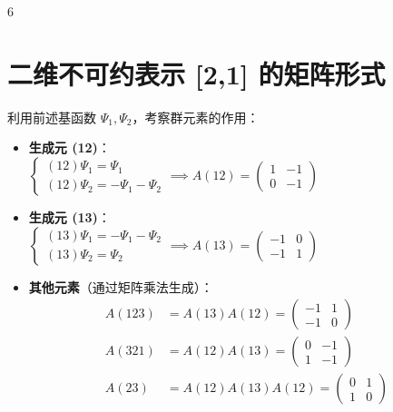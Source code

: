 \documentclass[landscape]{article}
\begin{document}
\begin{multicols*}{6}
\section*{二维不可约表示 [2,1] 的矩阵形式}
利用前述基函数 $\Psi_1, \Psi_2$，考察群元素的作用：
\begin{itemize}
    \item \textbf{生成元 (12)}：
    \\
    $
    \begin{cases} (12)\Psi_1 = \Psi_1 \\ (12)\Psi_2 = -\Psi_1 - \Psi_2 \end{cases}
    \implies A(12) = \begin{pmatrix} 1 & -1 \\ 0 & -1 \end{pmatrix}
    $
    \item \textbf{生成元 (13)}：
    \\
    $
    \begin{cases} (13)\Psi_1 = -\Psi_1 - \Psi_2 \\ (13)\Psi_2 = \Psi_2 \end{cases}
    \implies A(13) = \begin{pmatrix} -1 & 0 \\ -1 & 1 \end{pmatrix}
    $
    \item \textbf{其他元素}（通过矩阵乘法生成）：
    \begin{align*}
    A(123) &= A(13)A(12) = \begin{pmatrix} -1 & 1 \\ -1 & 0 \end{pmatrix} \\
    A(321) &= A(12)A(13) = \begin{pmatrix} 0 & -1 \\ 1 & -1 \end{pmatrix} \\
    A(23) &= A(12)A(13)A(12) = \begin{pmatrix} 0 & 1 \\ 1 & 0 \end{pmatrix}
    \end{align*}
\end{itemize}


\end{multicols*}
\end{document}
